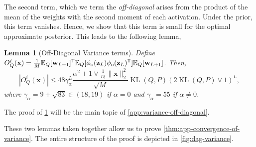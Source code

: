 \documentclass[twoside]{article}
\renewcommand{\ss}[1]{_{\text{#1}}}
\newcommand{\vw}{\mathbf{w}}
\newcommand{\vx}{\mathbf{x}}
\newcommand{\vz}{\mathbf{z}}
\newcommand{\E}{\mathbb{E}}
\renewcommand{\P}{\mathbb{P}}
\newcommand{\Q}{\mathbb{Q}}
\renewcommand{\Q}{\ensuremath{Q}}
\renewcommand{\P}{\ensuremath{P}}
\newcommand{\T}{\text{\textsf{T}}}
\newcommand{\KL}{\operatorname{KL}}
\renewcommand{\ss}[1]{_{\text{#1}}}        %
\theoremstyle{theoremstyle}
\newtheorem{lemma}[theorem]{Lemma}
\begin{document}
The second term, which we term the  \textit{off-diagonal} arises from the product of the mean of the weights with the second moment of each activation. Under the prior, this term vanishes. Hence, we show that this term is small for the optimal approximate posterior. This leads to the following lemma,
\begin{lemma}[Off-Diagonal Variance terms]\label{lem:app-off-diagonal-variance}
Define $
O^i_{\Q}(\vx) = \frac{1}{M}\E_{\Q}[\vw_{L+1}]^\T\E_{\Q}[\phi\ss{o}(\vz_{L})\phi\ss{o}(\vz_{L})^\T]\E_{\Q}[\vw_{L+1}]$.
Then,
\begin{equation}
    |O^i_{\Q}(\vx)| \leq 48\gamma_\alpha^{L}\frac{\alpha^2 + 1\lor \tfrac1{D\ss{i}}\|\vx\|^2_2}{\sqrt{M}}
    \KL(\Q,\P)(2\KL(\Q,\P) \lor 1)^{L},
\end{equation}
where $\gamma_\alpha = 9 + \sqrt{83} \in (18,19)$ if $\alpha=0$ and $\gamma_\alpha = 55$ if $\alpha\neq0$.
\end{lemma}
The proof of \cref{lem:app-off-diagonal-variance} will be the main topic of \cref{app:variance-off-diagonal}.

These two lemmas taken together allow us to prove \cref{thm:app-convergence-of-variance}. The entire structure of the proof is depicted in \cref{fig:dag-variance}.
\end{document}
